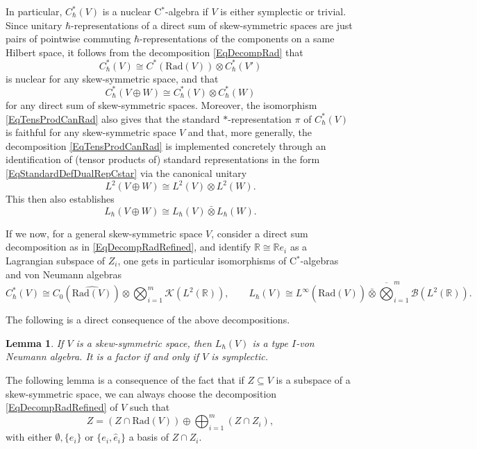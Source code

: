 \documentclass[11pt, reqno]{amsart}
\newtheorem{lemma}[theorem]{Lemma}
\theoremstyle{definition}
\numberwithin{equation}{section}
\def\R{\mathbb R}
\newcommand{\Bc}{\mathcal{B}}
\newcommand{\Kc}{\mathcal{K}}
\newcommand{\Rad}{\mathrm{Rad}}
\begin{document}
In particular, $C^*_{\hbar}(V)$ is a nuclear C$^*$-algebra if $V$ is either symplectic or trivial. Since unitary $\hbar$-representations of a direct sum of skew-symmetric spaces are just pairs of pointwise commuting $\hbar$-representations of the components on a same Hilbert space, it follows from the decomposition \eqref{EqDecompRad} that 
\begin{equation}\label{EqTensProdCanRad}
C^*_{\hbar}(V)\cong C^*(\Rad(V))\otimes C^*_{\hbar}(V')
\end{equation}
is nuclear for any skew-symmetric space, and that 
\begin{equation}\label{EqDirSumTens}
C^*_{\hbar}(V\oplus W) \cong C^*_{\hbar}(V) \otimes C^*_{\hbar}(W)
\end{equation}
for any direct sum of skew-symmetric spaces. Moreover, the isomorphism \eqref{EqTensProdCanRad} also gives that the standard $*$-representation $\pi$ of $C^*_{\hbar}(V)$ is faithful for any skew-symmetric space $V$ and that, more generally, the decomposition \eqref{EqTensProdCanRad} is implemented concretely through an identification of (tensor products of) standard representations in the form \eqref{EqStandardDefDualRepCstar} via the canonical unitary 
\[
L^2(V\oplus W) \cong L^2(V) \otimes L^2(W).
\]
This then also establishes
\[
L_{\hbar}(V\oplus W) \cong L_{\hbar}(V)\bar{\otimes} L_{\hbar}(W).
\]


If we now, for a general skew-symmetric space $V$, consider a direct sum decomposition as in \eqref{EqDecompRadRefined}, and identify $\R\cong \R e_i$ as a Lagrangian subspace of $Z_i$, one gets in particular
isomorphisms of C$^*$-algebras and von Neumann algebras 
\begin{equation}\label{EqIsoSkewBilvN}
C_{\hbar}^*(V) \cong C_0(\widehat{\Rad(V)}) \otimes  \bigotimes_{i=1}^m\Kc(L^2(\R)),\qquad L_{\hbar}(V) \cong L^{\infty}(\widehat{\Rad(V)})\bar{\otimes}\overline{\bigotimes}_{i=1}^m\Bc(L^2(\R)). 
\end{equation}


The following is a direct consequence of the above decompositions.



\begin{lemma}\label{LemTypeIRieff}
If $V$ is a skew-symmetric space, then $L_{\hbar}(V)$ is a type $I$-von Neumann algebra. It is a factor if and only if $V$ is symplectic.
\end{lemma}

The following lemma is a consequence of the fact that if $Z \subseteq V$ is a subspace of a skew-symmetric space, we can always choose the decomposition \eqref{EqDecompRadRefined} of $V$ such that 
\[
Z = (Z\cap \Rad(V)) \oplus \bigoplus_{i=1}^m (Z\cap Z_i),
\]
with either $\emptyset, \{e_i\}$ or $\{e_i,\hat{e}_i\}$ a basis of $Z\cap Z_i$. 
\end{document}
